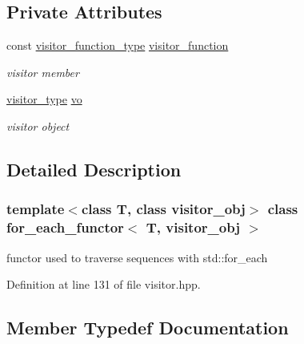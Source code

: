 \subsection*{Private Attributes}
\begin{DoxyCompactItemize}
\item 
const \hyperlink{classfor__each__functor_a959ddc30176d0364c4ceb00d09ae996b}{visitor\+\_\+function\+\_\+type} \hyperlink{classfor__each__functor_aab63d088709b7e2f5ce147322272c54a}{visitor\+\_\+function}
\begin{DoxyCompactList}\small\item\em visitor member \end{DoxyCompactList}\item 
\hyperlink{classfor__each__functor_ad8dbe39e38c2b3c71543522a86565122}{visitor\+\_\+type} \hyperlink{classfor__each__functor_a1dc5e71df160917fa6317006ed4d62dd}{vo}
\begin{DoxyCompactList}\small\item\em visitor object \end{DoxyCompactList}\end{DoxyCompactItemize}


\subsection{Detailed Description}
\subsubsection*{template$<$class T, class visitor\+\_\+obj$>$\newline
class for\+\_\+each\+\_\+functor$<$ T, visitor\+\_\+obj $>$}

functor used to traverse sequences with std\+::for\+\_\+each 

Definition at line 131 of file visitor.\+hpp.



\subsection{Member Typedef Documentation}
\mbox{\label{classfor__each__functor_a959ddc30176d0364c4ceb00d09ae996b}} 
